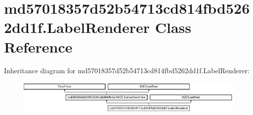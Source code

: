 \hypertarget{classmd57018357d52b54713cd814fbd5262dd1f_1_1LabelRenderer}{}\section{md57018357d52b54713cd814fbd5262dd1f.\+Label\+Renderer Class Reference}
\label{classmd57018357d52b54713cd814fbd5262dd1f_1_1LabelRenderer}
Inheritance diagram for md57018357d52b54713cd814fbd5262dd1f.\+Label\+Renderer\+:\begin{figure}[H]
\begin{center}
\leavevmode
\includegraphics[height=1.604584cm]{classmd57018357d52b54713cd814fbd5262dd1f_1_1LabelRenderer}
\end{center}
\end{figure}
